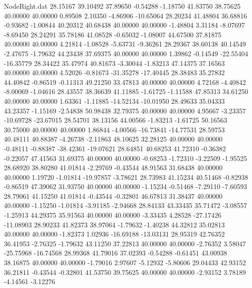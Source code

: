 \begin{filecontents}{NodeRight.dat}
  28.15167   39.10492   37.89650    -0.54288   -1.18750   41.83750   38.75625   40.00000   40.00000    0.89508    2.10350   -4.86906  -10.65064
  28.20234   41.48804   36.68816    -0.93682   -1.00844   40.20312   40.68438   40.00000   40.00000   -1.48804    3.31184   -8.07697   -8.69450
  28.24291   35.78186   41.08528    -0.65032   -1.08007   44.67500   37.81875   40.00000   40.00000    4.21814   -1.08528   -5.63731   -9.36261
  28.29367   38.60138   40.14549    -2.47675   -1.79632   44.23438   37.69375   40.00000   40.00000    1.39862   -0.14549  -22.55404  -16.35779
  28.34422   35.47974   40.81673    -3.30044   -1.83213   47.14375   37.16563   40.00000   40.00000    4.52026   -0.81673  -31.35278  -17.40445
  28.38483   35.27832   44.40842    -0.86519   -0.11313   49.21250   33.47813   40.00000   40.00000    4.72168   -4.40842   -8.00069   -1.04616
  28.43557   38.36639   41.11885    -1.61725   -1.11588   47.85313   34.61250   40.00000   40.00000    1.63361   -1.11885  -14.52134  -10.01950
  28.49633   35.04333   43.23357    -1.15169   -2.54838   50.98438   32.79375   40.00000   40.00000    4.95667   -3.23357  -10.69728  -23.67015
  28.54701   38.13156   44.00566    -1.83213   -1.61725   50.16563   30.75000   40.00000   40.00000    1.86844   -4.00566  -16.73841  -14.77531
  28.59753   40.48111   40.88387    -4.26738   -2.11863   48.10625   32.28125   40.00000   40.00000   -0.48111   -0.88387  -38.42361  -19.07621
  28.64851   40.68253   41.72310    -0.36382   -0.22057   47.41563   31.69375   40.00000   40.00000   -0.68253   -1.72310   -3.22509   -1.95525
  28.68920   38.80280   41.01814    -2.29769   -0.43544   48.91563   31.68438   40.00000   40.00000    1.19720   -1.01814  -19.97857   -3.78621
  28.73983   41.15234   40.51468    -0.82938   -0.86519   47.39062   31.93750   40.00000   40.00000   -1.15234   -0.51468   -7.29110   -7.60593
  28.79061   41.15250   41.01814    -0.43544   -0.32801   46.67813   31.38437   40.00000   40.00000   -1.15250   -1.01814   -3.91185   -2.94668
  28.84133   43.33435   35.71472    -3.08557   -1.25913   44.29375   35.91563   40.00000   40.00000   -3.33435    4.28528  -27.17426  -11.08903
  28.90233   41.82373   38.97064    -1.79632   -1.40238   44.32812   35.02813   40.00000   40.00000   -1.82373    1.02936  -16.69188  -13.03131
  28.95319   42.76352   36.41953    -2.76325   -1.79632   43.11250   37.22813   40.00000   40.00000   -2.76352    3.58047  -25.75968  -16.74568
  28.99368   41.79016   37.02393    -0.54288   -0.61451   43.00938   38.16875   40.00000   40.00000   -1.79016    2.97607   -5.12932   -5.80606
  29.04433   42.93152   36.21811    -0.43544   -0.32801   41.53750   39.75625   40.00000   40.00000   -2.93152    3.78189   -4.14561   -3.12276

\end{filecontents}

